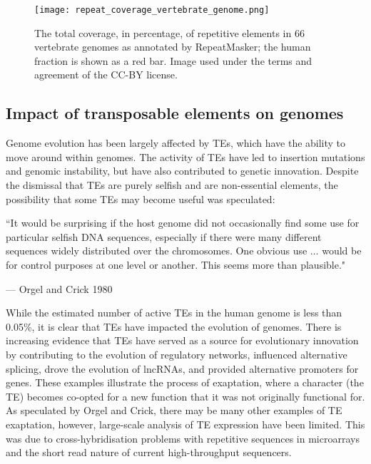 \begin{figure}[!ht]
   \centering
   \texttt{[image: repeat\_coverage\_vertebrate\_genome.png]}
   \caption[Coverage of repetitive elements in vertebrate genomes]{The total coverage, in percentage, of repetitive elements in 66 vertebrate genomes as annotated by RepeatMasker; the human fraction is shown as a red bar\cite{tang2014repcoverage}. Image used under the terms and agreement of the CC-BY license.}
   \label{fig:repeat_coverage_vertebrate_genome}
\end{figure}

\subsection{Impact of transposable elements on genomes}

Genome evolution has been largely affected by TEs, which have the ability to move around within genomes. The activity of TEs have led to insertion mutations and genomic instability, but have also contributed to genetic innovation\cite{pmid19763152}. Despite the dismissal that TEs are purely selfish and are non-essential elements, the possibility that some TEs may become useful was speculated:

\epigraph{``It would be surprising if the host genome did not occasionally find some use for particular selfish DNA sequences, especially if there were many different sequences widely distributed over the chromosomes. One obvious use $\ldots$ would be for control purposes at one level or another. This seems more than plausible."}{--- \textup{Orgel and Crick 1980}}

While the estimated number of active TEs in the human genome is less than 0.05\%\cite{pmid17331616}, it is clear that TEs have impacted the evolution of genomes. There is increasing evidence that TEs have served as a source for evolutionary innovation by contributing to the evolution of regulatory networks\cite{pmid18368054}, influenced alternative splicing\cite{pmid18818740}, drove the evolution of lncRNAs\cite{pmid23637635}, and provided alternative promoters for genes\cite{pmid19577618}. These examples illustrate the process of exaptation, where a character (the TE) becomes co-opted for a new function that it was not originally functional for\cite{Gould01011982}. As speculated by Orgel and Crick, there may be many other examples of TE exaptation, however, large-scale analysis of TE expression have been limited. This was due to cross-hybridisation problems with repetitive sequences in microarrays and the short read nature of current high-throughput sequencers.

